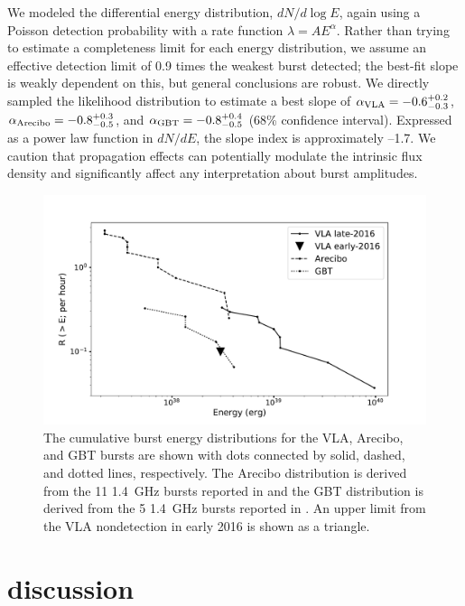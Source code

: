 \documentclass[twocolumn]{aastex61}
\begin{document}
We modeled the differential energy distribution, $dN/d\log{E}$, again using a Poisson detection probability with a rate function $\lambda = A E^{\alpha}$. Rather than trying to estimate a completeness limit for each energy distribution, we assume an effective detection limit of 0.9 times the weakest burst detected; the best-fit slope is weakly dependent on this, but general conclusions are robust. We directly sampled the likelihood distribution to estimate a best slope of $\alpha_{\rm{VLA}}=-0.6^{+0.2}_{-0.3}$, $\alpha_{\rm{Arecibo}}=-0.8^{+0.3}_{-0.5}$, and $\alpha_{\rm{GBT}}=-0.8^{+0.4}_{-0.5}$ (68\% confidence interval). Expressed as a power law function in $dN/dE$, the slope index is approximately --1.7. We caution that propagation effects can potentially modulate the intrinsic flux density and significantly affect any interpretation about burst amplitudes. 

\begin{figure}[htb]
\begin{center}
\includegraphics[width=\columnwidth]{energy_disn.pdf}
\caption{The cumulative burst energy distributions for the VLA, Arecibo, and GBT bursts are shown with dots connected by solid, dashed, and dotted lines, respectively. The Arecibo distribution is derived from the 11 1.4~GHz bursts reported in \citet{2016Natur.531..202S} and the GBT distribution is derived from the 5 1.4~GHz bursts reported in \citet{2016arXiv160308880S}. An upper limit from the VLA nondetection in early 2016 is shown as a triangle. \label{fig:ed}}
\end{center}
\end{figure}

\section{discussion}
\label{sec:disc}
\end{document}
